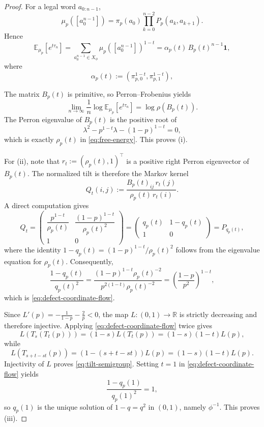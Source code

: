 \documentclass[pdflatex,sn-basic,Numbered]{sn-jnl}
\theoremstyle{thmstyleone}
\theoremstyle{thmstyletwo}
\theoremstyle{thmstylethree}
\newcommand{\RR}{\mathbb{R}}
\newcommand{\EE}{\mathbb{E}}
\begin{document}
\begin{proof}
For a legal word $a_{0:n-1}$,
\[
\mu_p([a_0^{n-1}])=\pi_p(a_0)\prod_{k=0}^{n-2}P_p(a_k,a_{k+1}).
\]
Hence
\[
\EE_{\mu_p}[e^{t\tau_n}]
=
\sum_{a_0^{n-1}\in X_\phi}\mu_p([a_0^{n-1}])^{1-t}
=
\alpha_p(t)\,B_p(t)^{n-1}\mathbf{1},
\]
where
\[
\alpha_p(t):=(\pi_{p,0}^{1-t},\pi_{p,1}^{1-t}),
\]

The matrix $B_p(t)$ is primitive, so Perron--Frobenius yields
\[
\lim_{n\to\infty}\frac{1}{n}\log \EE_{\mu_p}[e^{t\tau_n}]
=
\log\rho(B_p(t)).
\]
The Perron eigenvalue of $B_p(t)$ is the positive root of
\[
\lambda^2-p^{1-t}\lambda-(1-p)^{1-t}=0,
\]
which is exactly $\rho_p(t)$ in \eqref{eq:free-energy}. This proves (i).

For (ii), note that $r_t:=(\rho_p(t),1)^\top$ is a positive right Perron eigenvector of $B_p(t)$. The normalized tilt is therefore the Markov kernel
\[
Q_t(i,j):=\frac{B_p(t)_{ij}\,r_t(j)}{\rho_p(t)\,r_t(i)}.
\]
A direct computation gives
\[
Q_t=
\begin{pmatrix}
\dfrac{p^{1-t}}{\rho_p(t)} & \dfrac{(1-p)^{1-t}}{\rho_p(t)^2}\\[1.5ex]
1 & 0
\end{pmatrix}
=
\begin{pmatrix}
q_p(t) & 1-q_p(t)\\
1 & 0
\end{pmatrix}
=P_{q_p(t)},
\]
where the identity $1-q_p(t)=(1-p)^{1-t}/\rho_p(t)^2$ follows from the eigenvalue equation for $\rho_p(t)$. Consequently,
\[
\frac{1-q_p(t)}{q_p(t)^2}
=
\frac{(1-p)^{1-t}\rho_p(t)^{-2}}{p^{2(1-t)}\rho_p(t)^{-2}}
=
\left(\frac{1-p}{p^2}\right)^{1-t},
\]
which is \eqref{eq:defect-coordinate-flow}.

Since $L'(p)=-\frac{1}{1-p}-\frac{2}{p}<0$, the map $L:(0,1)\to\RR$ is strictly decreasing and therefore injective. Applying \eqref{eq:defect-coordinate-flow} twice gives
\[
L(T_s(T_t(p)))=(1-s)L(T_t(p))=(1-s)(1-t)L(p),
\]
while
\[
L(T_{s+t-st}(p))=(1-(s+t-st))L(p)=(1-s)(1-t)L(p).
\]
Injectivity of $L$ proves \eqref{eq:tilt-semigroup}. Setting $t=1$ in \eqref{eq:defect-coordinate-flow} yields
\[
\frac{1-q_p(1)}{q_p(1)^2}=1,
\]
so $q_p(1)$ is the unique solution of $1-q=q^2$ in $(0,1)$, namely $\phi^{-1}$. This proves (iii).


\end{proof}
\end{document}
